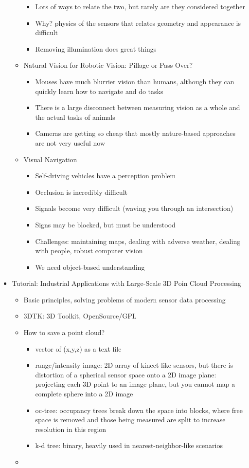 \documentclass[10pt]{article}
\theoremstyle{plain}\theorembodyfont{\normalfont}
\begin{document}
\begin{itemize}
\begin{itemize}
\begin{itemize}
\item Lots of ways to relate the two, but rarely are they considered together
\item Why? physics of the sensors that relates geometry and appearance is difficult
\item Removing illumination does great things
\end{itemize}
\item Natural Vision for Robotic Vision: Pillage or Pass Over?
\begin{itemize}
\item Mouses have much blurrier vision than humans, although they can quickly learn how to navigate and do tasks
\item There is a large disconnect between measuring vision as a whole and the actual tasks of animals
\item Cameras are getting so cheap that mostly nature-based approaches are not very useful now
\end{itemize}
\item Visual Navigation
\begin{itemize}
\item Self-driving vehicles have a perception problem
\item Occlusion is incredibly difficult
\item Signals become very difficult (waving you through an intersection)
\item Signs may be blocked, but must be understood
\item Challenges: maintaining maps, dealing with adverse weather, dealing with people, robust computer vision
\item We need object-based understanding
\end{itemize}
\end{itemize}
\newpage
\item Tutorial: Industrial Applications with Large-Scale 3D Poin Cloud Processing
\begin{itemize}
\item Basic principles, solving problems of modern sensor data processing
\item 3DTK: 3D Toolkit, OpenSource/GPL
\item How to save a point cloud?
\begin{itemize}
\item vector of (x,y,z) as a text file
\item range/intensity image: 2D array of kinect-like sensors, but there is distortion of a spherical sensor space onto a 2D image plane: projecting each 3D point to an image plane, but you cannot map a complete sphere into a 2D image
\item oc-tree: occupancy trees break down the space into blocks, where free space is removed and those being measured are split to increase resolution in this region
\item k-d tree: binary, heavily used in nearest-neighbor-like scenarios
\end{itemize}
\item
\end{itemize}
\end{itemize}
\end{document}
